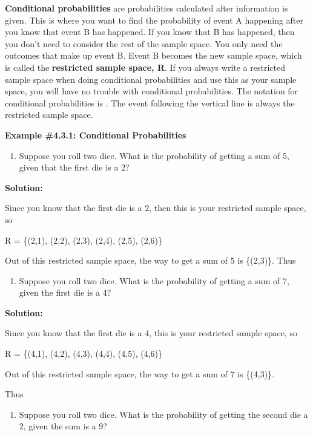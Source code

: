 \documentclass[]{book}
\providecommand{\tightlist}{%
  \setlength{\itemsep}{0pt}\setlength{\parskip}{0pt}}
\begin{document}
\textbf{Conditional probabilities} are probabilities calculated after information is given. This is where you want to find the probability of event A happening after you know that event B has happened. If you know that B has happened, then you don't need to consider the rest of the sample space. You only need the outcomes that make up event B. Event B becomes the new sample space, which is called the \textbf{restricted sample space, R}. If you always write a restricted sample space when doing conditional probabilities and use this as your sample space, you will have no trouble with conditional probabilities. The notation for conditional probabilities is . The event following the vertical line is always the restricted sample space.

\textbf{Example \#4.3.1: Conditional Probabilities}

\begin{enumerate}
\def\labelenumi{\alph{enumi}.}
\tightlist
\item
  Suppose you roll two dice. What is the probability of getting a sum
  of 5, given that the first die is a 2?
\end{enumerate}

\textbf{Solution:}

Since you know that the first die is a 2, then this is your
restricted sample space, so

R = \{(2,1), (2,2), (2,3), (2,4), (2,5), (2,6)\}

Out of this restricted sample space, the way to get a sum of 5 is
\{(2,3)\}. Thus

\begin{enumerate}
\def\labelenumi{\alph{enumi}.}
\setcounter{enumi}{1}
\tightlist
\item
  Suppose you roll two dice. What is the probability of getting a sum
  of 7, given the first die is a 4?
\end{enumerate}

\textbf{Solution:}

Since you know that the first die is a 4, this is your restricted
sample space, so

R = \{(4,1), (4,2), (4,3), (4,4), (4,5), (4,6)\}

Out of this restricted sample space, the way to get a sum of 7 is
\{(4,3)\}.

Thus

\begin{enumerate}
\def\labelenumi{\alph{enumi}.}
\setcounter{enumi}{2}
\tightlist
\item
  Suppose you roll two dice. What is the probability of getting the
  second die a 2, given the sum is a 9?
\end{enumerate}
\end{document}
